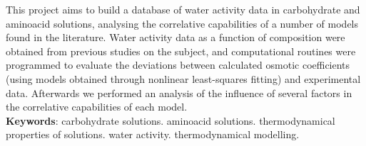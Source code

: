 \documentclass[
	12pt,				%
	openright,
	twoside,
	a4paper,			%
	brazil,			%
	french,				%
	english				%
	]{abntex2}
\begin{document}

\frenchspacing

\imprimircapa

\imprimirfolhaderosto


\setlength{\absparsep}{18pt}
\begin{resumo}
	This project aims to build a database of water activity data in
	carbohydrate and aminoacid solutions, analysing the correlative
	capabilities of a number of models found in the literature. Water
	activity data as a function of composition were obtained from previous
	studies on the subject, and computational routines were programmed
	to evaluate the deviations between calculated osmotic coefficients
	(using models obtained through nonlinear least-squares fitting) and
	experimental data. Afterwards we performed an analysis of the influence
	of several factors in the correlative capabilities of each model.\\
	\textbf{Keywords}: carbohydrate solutions.
			aminoacid solutions.
			thermodynamical properties of solutions.
			water activity.
			thermodynamical modelling.
\end{resumo}

\listoffigures*
\cleardoublepage


\listoftables*
\cleardoublepage
\end{document}

